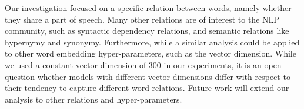 \documentclass[11pt,a4paper]{article}
\begin{document}
    Our investigation focused on a specific relation between words,
    namely whether they share a part of speech.
    Many other relations are of interest to the NLP
    community, such as syntactic dependency relations,
    and semantic relations like hypernymy and synonymy.
    Furthermore, while a similar analysis could be applied to other word
    embedding hyper-parameters, such as the vector dimension.
    While we used a constant vector dimension of 300 in our experiments,
    it is an open question whether models with different vector dimensions
    differ with respect to their tendency to capture different word relations.
    Future work will extend our analysis to other relations and hyper-parameters.

    
    
    
\end{document}
